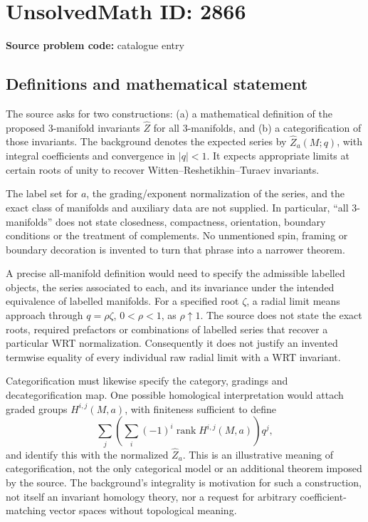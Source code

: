 \documentclass[11pt]{article}
\begin{document}
\section*{UnsolvedMath ID: 2866}
\textbf{Source problem code:} catalogue entry
\subsection{Definitions and mathematical statement}
The source asks for two constructions: (a) a mathematical definition of the proposed 3-manifold invariants \(\widehat Z\) for all 3-manifolds, and (b) a categorification of those invariants. The background denotes the expected series by \(\widehat Z_a(M;q)\), with integral coefficients and convergence in \(|q|<1\). It expects appropriate limits at certain roots of unity to recover Witten--Reshetikhin--Turaev invariants.

The label set for \(a\), the grading/exponent normalization of the series, and the exact class of manifolds and auxiliary data are not supplied. In particular, ``all 3-manifolds'' does not state closedness, compactness, orientation, boundary conditions or the treatment of complements. No unmentioned spin, framing or boundary decoration is invented to turn that phrase into a narrower theorem.

A precise all-manifold definition would need to specify the admissible labelled objects, the series associated to each, and its invariance under the intended equivalence of labelled manifolds. For a specified root \(\zeta\), a radial limit means approach through \(q=\rho\zeta\), \(0<\rho<1\), as \(\rho\uparrow1\). The source does not state the exact roots, required prefactors or combinations of labelled series that recover a particular WRT normalization. Consequently it does not justify an invented termwise equality of every individual raw radial limit with a WRT invariant.

Categorification must likewise specify the category, gradings and decategorification map. One possible homological interpretation would attach graded groups \(H^{i,j}(M,a)\), with finiteness sufficient to define
\[
\sum_j\left(\sum_i(-1)^i\operatorname{rank}H^{i,j}(M,a)\right)q^j,
\]
and identify this with the normalized \(\widehat Z_a\). This is an illustrative meaning of categorification, not the only categorical model or an additional theorem imposed by the source. The background's integrality is motivation for such a construction, not itself an invariant homology theory, nor a request for arbitrary coefficient-matching vector spaces without topological meaning.
\end{document}
